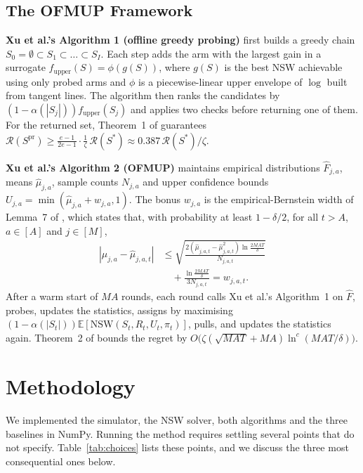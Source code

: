 \documentclass[letterpaper]{article}
\newcommand{\NSW}{\mathrm{NSW}}
\newcommand{\E}{\mathbb{E}}
\begin{document}
\subsection{The OFMUP Framework}
\label{sec:ofmup}
\textbf{Xu et al.'s Algorithm 1 (offline greedy probing)} first builds a greedy
chain $S_0=\emptyset\subset S_1\subset\dots\subset S_I$. Each step adds the arm
with the largest gain in a surrogate $f_{\mathrm{upper}}(S)=\phi(g(S))$, where
$g(S)$ is the best NSW achievable using only probed arms and $\phi$ is a
piecewise-linear upper envelope of $\log$ built from tangent lines. The
algorithm then ranks the candidates by $(1-\alpha(|S_j|))f_{\mathrm{upper}}(S_j)$
and applies two checks before returning one of them. For the returned set,
\label{thm:1}Theorem~1 of \citet{xu2026fair} guarantees
$\mathcal{R}(S^{\mathrm{pr}})\ge\frac{e-1}{2e-1}\cdot\frac1\zeta\,\mathcal{R}(S^\ast)\approx 0.387\,\mathcal{R}(S^\ast)/\zeta$.

\textbf{Xu et al.'s Algorithm 2 (OFMUP)} maintains empirical distributions
$\hat F_{j,a}$, means $\hat\mu_{j,a}$, sample counts $N_{j,a}$ and upper
confidence bounds $U_{j,a}=\min(\hat\mu_{j,a}+w_{j,a},1)$. The bonus $w_{j,a}$ is
the empirical-Bernstein width \citep{maurer2009empirical} of
\label{lem:7}Lemma~7 of \citet{xu2026fair}, which states that,
with probability at least $1-\delta/2$, for all $t>A$, $a\in[A]$ and $j\in[M]$,
\begin{align*}
  |\mu_{j,a}-\hat\mu_{j,a,t}|
  &\le\sqrt{\frac{2(\hat\mu_{j,a,t}-\hat\mu_{j,a,t}^2)\ln\frac{2MAT}{\delta}}{N_{j,a,t}}}\\
  &\quad+\frac{\ln\frac{2MAT}{\delta}}{3N_{j,a,t}}=w_{j,a,t}.
\end{align*}
After a warm start of $MA$ rounds, each round calls Xu et al.'s Algorithm~1 on
$\hat F$, probes, updates the statistics, assigns by maximising
$(1-\alpha(|S_t|))\E[\NSW(S_t,R_t,U_t,\pi_t)]$, pulls, and updates the
statistics again. \label{thm:2}Theorem~2 of \citet{xu2026fair}
bounds the regret by $O\big(\zeta(\sqrt{MAT}+MA)\ln^c(MAT/\delta)\big)$.

\section{Methodology}
\label{sec:repro}

We implemented the simulator, the NSW solver, both algorithms and the three
baselines in NumPy. Running the method requires settling several points that
\citet{xu2026fair} do not specify. Table~\ref{tab:choices} lists these points,
and we discuss the three most consequential ones below.
\end{document}

